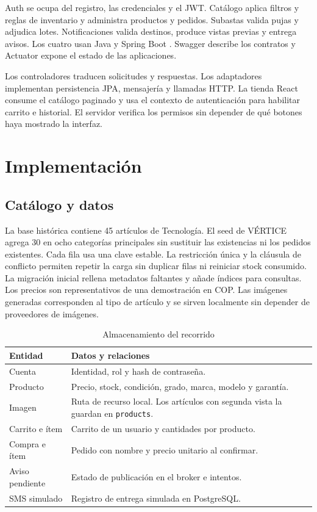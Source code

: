 \documentclass[conference]{IEEEtran}
\begin{document}
Auth se ocupa del registro, las credenciales y el JWT. Catálogo aplica filtros y reglas de inventario y administra productos y pedidos. Subastas valida pujas y adjudica lotes. Notificaciones valida destinos, produce vistas previas y entrega avisos. Los cuatro usan Java y Spring Boot \cite{spring}. Swagger describe los contratos y Actuator expone el estado de las aplicaciones.

Los controladores traducen solicitudes y respuestas. Los adaptadores implementan persistencia JPA, mensajería y llamadas HTTP. La tienda React consume el catálogo paginado y usa el contexto de autenticación para habilitar carrito e historial. El servidor verifica los permisos sin depender de qué botones haya mostrado la interfaz.

\clearpage
\section{Implementación}
\subsection{Catálogo y datos}
La base histórica contiene 45 artículos de Tecnología. El seed de VÉRTICE agrega 30 en ocho categorías principales sin sustituir las existencias ni los pedidos existentes. Cada fila usa una clave estable. La restricción única y la cláusula de conflicto permiten repetir la carga sin duplicar filas ni reiniciar stock consumido. La migración inicial rellena metadatos faltantes y añade índices para consultas. Los precios son representativos de una demostración en COP. Las imágenes generadas corresponden al tipo de artículo y se sirven localmente sin depender de proveedores de imágenes.

\begin{table}[!ht]
\caption{Almacenamiento del recorrido}
\centering\footnotesize
\begin{tabularx}{\columnwidth}{@{}lX@{}}
\toprule
Entidad & Datos y relaciones\\\midrule
Cuenta & Identidad, rol y hash de contraseña.\\
Producto & Precio, stock, condición, grado, marca, modelo y garantía.\\
Imagen & Ruta de recurso local. Los artículos con segunda vista la guardan en \texttt{products}.\\
Carrito e ítem & Carrito de un usuario y cantidades por producto.\\
Compra e ítem & Pedido con nombre y precio unitario al confirmar.\\
Aviso pendiente & Estado de publicación en el broker e intentos.\\
SMS simulado & Registro de entrega simulada en PostgreSQL.\\
\bottomrule
\end{tabularx}
\end{table}
\end{document}
